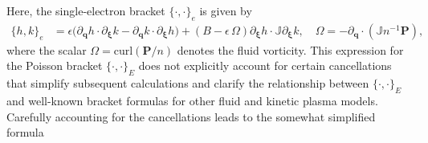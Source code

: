 \documentclass[%
 aip,
 amsmath,amssymb,
reprint, onecolumn %
]{revtex4-1}
\begin{document}
Here, the single-electron bracket $\{\cdot,\cdot\}_e$ is given by
\begin{align*}
\{h,k\}_e & = \epsilon\bigg(\partial_{\bm{q}}h\cdot\partial_{\bm{\xi}}k - \partial_{\bm{q}}k\cdot\partial_{\bm{\xi}}h\bigg) + (B - \epsilon\,\Omega)\partial_{\bm{\xi}}h\cdot\mathbb{J}\partial_{\bm{\xi}}k,\quad \Omega = -\partial_{\bm{q}}\cdot(\mathbb{J}n^{-1}\bm{P}),
\end{align*}
where the scalar $\Omega = \text{curl}(\bm{P}/n)$ denotes the fluid vorticity. This expression for the Poisson bracket $\{\cdot,\cdot\}_E$ does not explicitly account for certain cancellations that simplify subsequent calculations and clarify the relationship between $\{\cdot,\cdot\}_E$ and well-known bracket formulas for other fluid and kinetic plasma models. Carefully accounting for the cancellations leads to the somewhat simplified formula
\end{document}
